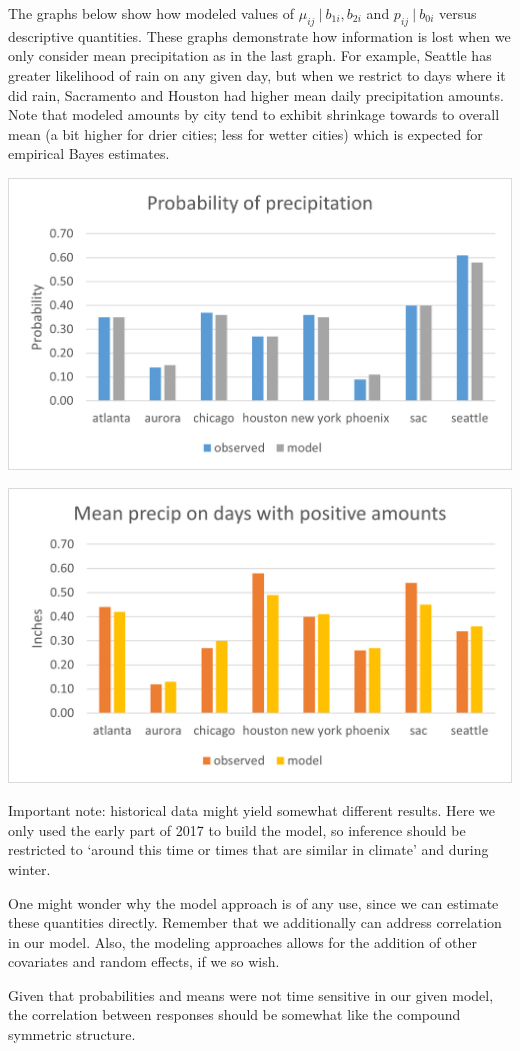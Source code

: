 \documentclass[
  9pt,
  ignorenonframetext,
]{beamer}
\begin{document}
\begin{frame}{}
\protect\hypertarget{section-11}{}
The graphs below show how modeled values of
\(\mu_{ij} \ |\ b_{1i},b_{2i}\) and \(p_{ij} \ |\ b_{0i}\) versus
descriptive quantities. These graphs demonstrate how information is lost
when we only consider mean precipitation as in the last graph. For
example, Seattle has greater likelihood of rain on any given day, but
when we restrict to days where it did rain, Sacramento and Houston had
higher mean daily precipitation amounts. Note that modeled amounts by
city tend to exhibit shrinkage towards to overall mean (a bit higher for
drier cities; less for wetter cities) which is expected for empirical
Bayes estimates.

\begin{center}\includegraphics[width=0.5\linewidth]{figs_L18/f5} \end{center}

\begin{center}\includegraphics[width=0.5\linewidth]{figs_L18/f6} \end{center}
\end{frame}

\begin{frame}{}
\protect\hypertarget{section-12}{}
Important note: historical data might yield somewhat different results.
Here we only used the early part of 2017 to build the model, so
inference should be restricted to `around this time or times that are
similar in climate' and during winter.

One might wonder why the model approach is of any use, since we can
estimate these quantities directly. Remember that we additionally can
address correlation in our model. Also, the modeling approaches allows
for the addition of other covariates and random effects, if we so wish.

Given that probabilities and means were not time sensitive in our given
model, the correlation between responses should be somewhat like the
compound symmetric structure.
\end{frame}
\end{document}
